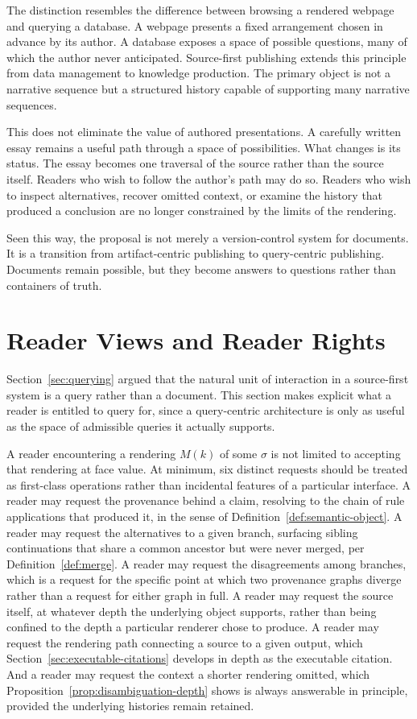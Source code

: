 \documentclass[11pt]{article}
\theoremstyle{definition}
\begin{document}
The distinction resembles the difference between browsing a rendered webpage and querying a database. A webpage presents a fixed arrangement chosen in advance by its author. A database exposes a space of possible questions, many of which the author never anticipated. Source-first publishing extends this principle from data management to knowledge production. The primary object is not a narrative sequence but a structured history capable of supporting many narrative sequences.

This does not eliminate the value of authored presentations. A carefully written essay remains a useful path through a space of possibilities. What changes is its status. The essay becomes one traversal of the source rather than the source itself. Readers who wish to follow the author's path may do so. Readers who wish to inspect alternatives, recover omitted context, or examine the history that produced a conclusion are no longer constrained by the limits of the rendering.

Seen this way, the proposal is not merely a version-control system for documents. It is a transition from artifact-centric publishing to query-centric publishing. Documents remain possible, but they become answers to questions rather than containers of truth.

\section{Reader Views and Reader Rights}
\label{sec:reader-rights}

Section~\ref{sec:querying} argued that the natural unit of interaction in a source-first system is a query rather than a document. This section makes explicit what a reader is entitled to query for, since a query-centric architecture is only as useful as the space of admissible queries it actually supports.

A reader encountering a rendering $M(k)$ of some $\sigma$ is not limited to accepting that rendering at face value. At minimum, six distinct requests should be treated as first-class operations rather than incidental features of a particular interface. A reader may request the provenance behind a claim, resolving to the chain of rule applications that produced it, in the sense of Definition~\ref{def:semantic-object}. A reader may request the alternatives to a given branch, surfacing sibling continuations that share a common ancestor but were never merged, per Definition~\ref{def:merge}. A reader may request the disagreements among branches, which is a request for the specific point at which two provenance graphs diverge rather than a request for either graph in full. A reader may request the source itself, at whatever depth the underlying object supports, rather than being confined to the depth a particular renderer chose to produce. A reader may request the rendering path connecting a source to a given output, which Section~\ref{sec:executable-citations} develops in depth as the executable citation. And a reader may request the context a shorter rendering omitted, which Proposition~\ref{prop:disambiguation-depth} shows is always answerable in principle, provided the underlying histories remain retained.
\end{document}
